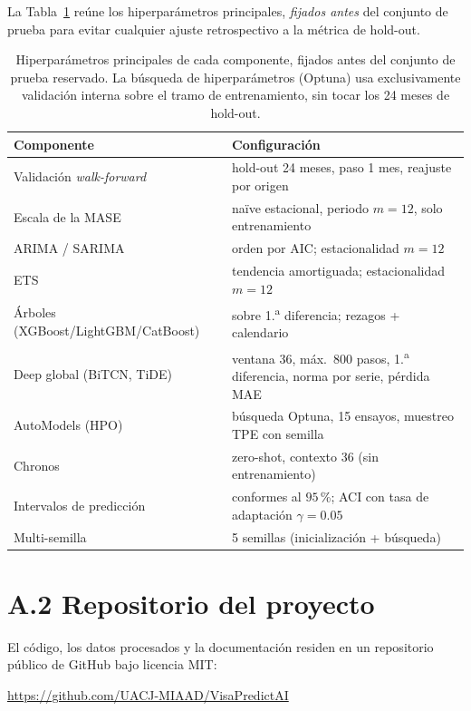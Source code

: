 \documentclass[12pt,letterpaper]{report}
\begin{document}
La Tabla~\ref{tab:hparams} reúne los hiperparámetros principales, \textit{fijados antes}
del conjunto de prueba para evitar cualquier ajuste retrospectivo a la métrica de hold-out.

\begin{table}[H]
\centering
\footnotesize
\caption[Hiperparámetros principales del protocolo]{Hiperparámetros principales de cada
componente, fijados antes del conjunto de prueba reservado. La búsqueda de
hiperparámetros (Optuna) usa exclusivamente validación interna sobre el tramo de
entrenamiento, sin tocar los 24 meses de hold-out.}
\label{tab:hparams}
\begin{tabular}{@{}p{4.2cm} p{9.3cm}@{}}
\toprule
\rowcolor{uacjblue!15}
\textbf{Componente} & \textbf{Configuración} \\ \midrule
Validación \textit{walk-forward} & hold-out 24 meses, paso 1 mes, reajuste por origen \\
Escala de la MASE & naïve estacional, periodo $m=12$, solo entrenamiento \\
ARIMA / SARIMA & orden por AIC; estacionalidad $m=12$ \\
ETS & tendencia amortiguada; estacionalidad $m=12$ \\
Árboles (XGBoost/LightGBM/CatBoost) & sobre 1.\textsuperscript{a} diferencia; rezagos + calendario \\
Deep global (BiTCN, TiDE) & ventana 36, máx.\ 800 pasos, 1.\textsuperscript{a} diferencia, norma por serie, pérdida MAE \\
AutoModels (HPO) & búsqueda Optuna, 15 ensayos, muestreo TPE con semilla \\
Chronos & zero-shot, contexto 36 (sin entrenamiento) \\
Intervalos de predicción & conformes al $95$\,\%; ACI con tasa de adaptación $\gamma=0.05$ \\
Multi-semilla & 5 semillas (inicialización + búsqueda) \\
\bottomrule
\end{tabular}
\end{table}

\section{A.2 Repositorio del proyecto}

El código, los datos procesados y la documentación residen en un repositorio
público de GitHub bajo licencia MIT:

\begin{center}
\url{https://github.com/UACJ-MIAAD/VisaPredictAI}
\end{center}
\end{document}
